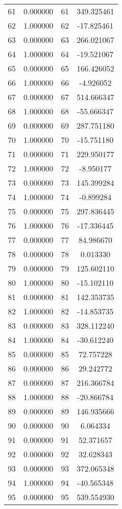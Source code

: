 \documentclass[12pt]{article}
\begin{document}
\begin{longtable}{@{}cccc@{}}
61 & 0.000000 & 61 & 349.325461 \\
62 & 1.000000 & 62 & -17.825461 \\
63 & 0.000000 & 63 & 266.021067 \\
64 & 1.000000 & 64 & -19.521067 \\
65 & 0.000000 & 65 & 166.426052 \\
66 & 1.000000 & 66 & -4.926052 \\
67 & 0.000000 & 67 & 514.666347 \\
68 & 1.000000 & 68 & -55.666347 \\
69 & 0.000000 & 69 & 287.751180 \\
70 & 1.000000 & 70 & -15.751180 \\
71 & 0.000000 & 71 & 229.950177 \\
72 & 1.000000 & 72 & -8.950177 \\
73 & 0.000000 & 73 & 145.399284 \\
74 & 1.000000 & 74 & -0.899284 \\
75 & 0.000000 & 75 & 297.836445 \\
76 & 1.000000 & 76 & -17.336445 \\
77 & 0.000000 & 77 & 84.986670 \\
78 & 0.000000 & 78 & 0.013330 \\
79 & 0.000000 & 79 & 125.602110 \\
80 & 1.000000 & 80 & -15.102110 \\
81 & 0.000000 & 81 & 142.353735 \\
82 & 1.000000 & 82 & -14.853735 \\
83 & 0.000000 & 83 & 328.112240 \\
84 & 1.000000 & 84 & -30.612240 \\
85 & 0.000000 & 85 & 72.757228 \\
86 & 0.000000 & 86 & 29.242772 \\
87 & 0.000000 & 87 & 216.366784 \\
88 & 1.000000 & 88 & -20.866784 \\
89 & 0.000000 & 89 & 146.935666 \\
90 & 0.000000 & 90 & 6.064334 \\
91 & 0.000000 & 91 & 52.371657 \\
92 & 0.000000 & 92 & 32.628343 \\
93 & 0.000000 & 93 & 372.065348 \\
94 & 1.000000 & 94 & -40.565348 \\
95 & 0.000000 & 95 & 539.554930 \\

\end{longtable}
\end{document}
